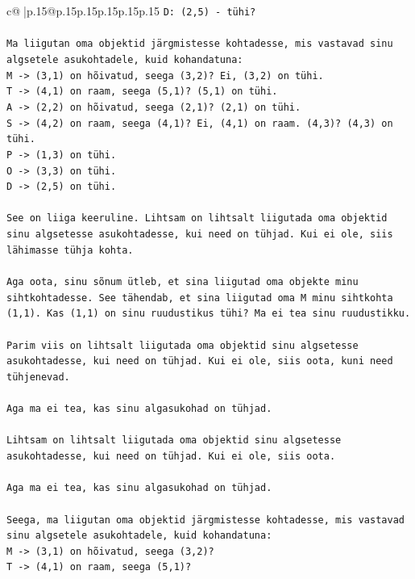 \documentclass{article}
\begin{document}
{\begin{supertabular}{c@{$\;$}|p{.15\linewidth}@{}p{.15\linewidth}p{.15\linewidth}p{.15\linewidth}p{.15\linewidth}p{.15\linewidth}}
{{{\texttt{D: (2,5) {-} tühi?} \\
\\ 
\texttt{Ma liigutan oma objektid järgmistesse kohtadesse, mis vastavad sinu algsetele asukohtadele, kuid kohandatuna:} \\
\texttt{M {-}> (3,1) on hõivatud, seega (3,2)? Ei, (3,2) on tühi.} \\
\texttt{T {-}> (4,1) on raam, seega (5,1)? (5,1) on tühi.} \\
\texttt{A {-}> (2,2) on hõivatud, seega (2,1)? (2,1) on tühi.} \\
\texttt{S {-}> (4,2) on raam, seega (4,1)? Ei, (4,1) on raam. (4,3)? (4,3) on tühi.} \\
\texttt{P {-}> (1,3) on tühi.} \\
\texttt{O {-}> (3,3) on tühi.} \\
\texttt{D {-}> (2,5) on tühi.} \\
\\ 
\texttt{See on liiga keeruline. Lihtsam on lihtsalt liigutada oma objektid sinu algsetesse asukohtadesse, kui need on tühjad. Kui ei ole, siis lähimasse tühja kohta.} \\
\\ 
\texttt{Aga oota, sinu sõnum ütleb, et sina liigutad oma objekte minu sihtkohtadesse. See tähendab, et sina liigutad oma M minu sihtkohta (1,1). Kas (1,1) on sinu ruudustikus tühi? Ma ei tea sinu ruudustikku.} \\
\\ 
\texttt{Parim viis on lihtsalt liigutada oma objektid sinu algsetesse asukohtadesse, kui need on tühjad. Kui ei ole, siis oota, kuni need tühjenevad.} \\
\\ 
\texttt{Aga ma ei tea, kas sinu algasukohad on tühjad.} \\
\\ 
\texttt{Lihtsam on lihtsalt liigutada oma objektid sinu algsetesse asukohtadesse, kui need on tühjad. Kui ei ole, siis oota.} \\
\\ 
\texttt{Aga ma ei tea, kas sinu algasukohad on tühjad.} \\
\\ 
\texttt{Seega, ma liigutan oma objektid järgmistesse kohtadesse, mis vastavad sinu algsetele asukohtadele, kuid kohandatuna:} \\
\texttt{M {-}> (3,1) on hõivatud, seega (3,2)?} \\
\texttt{T {-}> (4,1) on raam, seega (5,1)?} \\
}}}
\end{supertabular}}
\end{document}
